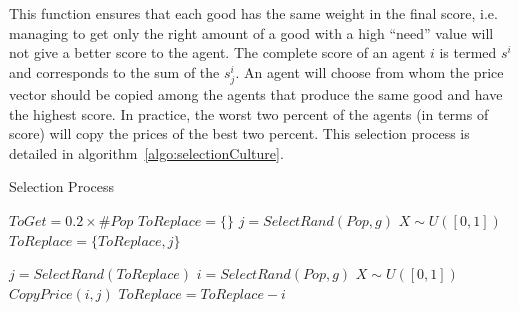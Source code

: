 \documentclass{wscpaperproc}
\begin{document}
This function ensures that each good has the same weight in the final score, i.e. managing to get only the right amount of a good with a high ``need'' value will not give a better score to the agent.
The complete score of an agent $i$ is termed $s^i$ and corresponds to the sum of the $s^i_j$. An agent will choose from whom the price vector should be copied among the agents that produce the same good and have the highest score. In practice, the worst two percent of the agents (in terms of score) will copy the prices of the best two percent. This selection process is detailed in algorithm~\ref{algo:selectionCulture}.


\begin{algorithm}
\caption{Selection Process}
\label{algo:selectionCulture}
	\begin{algorithmic}[1]
	\scriptsize
	\State	$ToGet = 0.2 \times \#Pop$
		\State	$ToReplace = \{\}$
			\State $ j = SelectRand(Pop,g) $ 
			\State $X \sim U([0,1])$ 
			 
				\State $ToReplace = \{ToReplace,j\}$
			\EndIf
		\EndWhile

			\State $ j = SelectRand(ToReplace) $ 
			\State $ i = SelectRand(Pop,g) $  
			\State $X \sim U([0,1])$ 
			 
				 
					\State $CopyPrice(i,j)$
					\State $ToReplace = ToReplace - i$
				\EndIf
			\EndIf

		\EndWhile\
	\EndFor
\end{algorithmic}
\end{algorithm}
\end{document}
